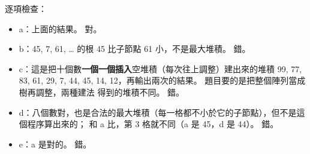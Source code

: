 \begin{pastsoln}
逐項檢查：
\begin{itemize}
\item a：上面的結果。 對。
\item b：45, 7, 61, \ldots{} 的根 45 比子節點 61 小，不是最大堆積。 錯。
\item c：這是把十個數\textbf{一個一個插入}空堆積（每次往上調整）建出來的堆積
99, 77, 83, 61, 29, 7, 44, 45, 14, 12，再輸出兩次的結果。 題目要的是把整個陣列當成樹再調整，兩種建法
得到的堆積不同。 錯。
\item d：八個數對，也是合法的最大堆積（每一格都不小於它的子節點），但不是這個程序算出來的；
和 a 比，第 3 格就不同（a 是 45，d 是 44）。 錯。
\item e：a 是對的。 錯。
\end{itemize}
\end{pastsoln}

